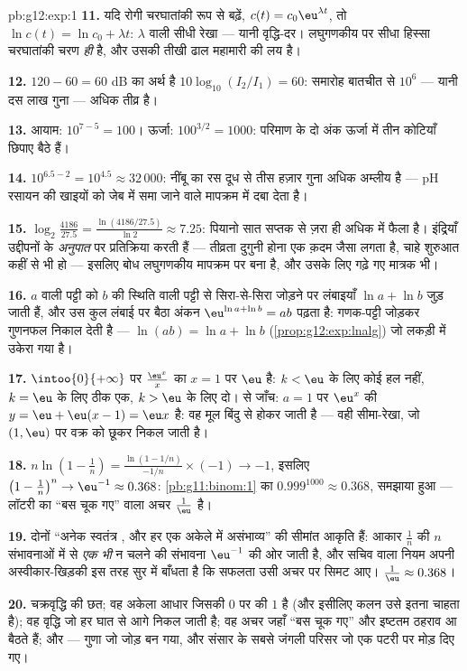 \begin{solution}{pb:g12:exp:1}
\textbf{11.} यदि रोगी चरघातांकी रूप से बढ़ें, $c(t) = c_0
\eu^{\lambda t}$, तो $\ln c(t) = \ln c_0 + \lambda t$:  $\lambda$
वाली सीधी रेखा --- यानी वृद्धि-दर। लघुगणकीय  पर सीधा हिस्सा चरघातांकी
चरण \emph{ही} है, और उसकी तीखी ढाल महामारी की लय है।

\textbf{12.} $120 - 60 = 60$ dB का अर्थ है $10\log_{10}(I_2/I_1) = 60$: समारोह बातचीत से $10^6$ --- यानी दस
लाख गुना --- अधिक तीव्र है।

\textbf{13.} आयाम: $10^{7-5} = 100$। ऊर्जा: $100^{3/2} = 1000$: परिमाण के दो अंक ऊर्जा में तीन कोटियाँ
छिपाए बैठे हैं।

\textbf{14.} $10^{6.5 - 2} = 10^{4.5} \approx 32\,000$: नींबू का रस दूध से तीस हज़ार गुना अधिक अम्लीय है --- pH
रसायन की खाइयों को जेब में समा जाने वाले मापक्रम में दबा देता है।

\textbf{15.} $\log_2\!\frac{4186}{27.5} =
\frac{\ln(4186/27.5)}{\ln 2} \approx 7.25$: पियानो सात सप्तक से ज़रा ही अधिक में फैला है। इंद्रियाँ
उद्दीपनों के \emph{अनुपात} पर प्रतिक्रिया करती हैं --- तीव्रता दुगुनी होना एक
क़दम जैसा लगता है, चाहे शुरुआत कहीं से भी हो --- इसलिए बोध लघुगणकीय मापक्रम
पर बना है, और उसके लिए गढ़े गए मात्रक भी।

\textbf{16.} $a$ वाली पट्टी को $b$ की स्थिति वाली पट्टी से सिरा-से-सिरा
जोड़ने पर लंबाइयाँ $\ln a + \ln b$ जुड़ जाती हैं, और उस कुल लंबाई पर बैठा अंकन $\eu^{\ln a + \ln b} = ab$
पढ़ता है: गणक-पट्टी  जोड़कर गुणनफल निकाल देती है --- $\ln(ab) = \ln a + \ln b$ (\cref{prop:g12:exp:lnalg}) जो
लकड़ी में उकेरा गया है।

\textbf{17.} $\intoo{0}{+\infty}$ पर $\frac{\eu^x}{x}$ का  $x = 1$ पर $\eu$ है: $k < \eu$ के लिए कोई
हल नहीं, $k = \eu$ के लिए ठीक एक, $k > \eu$ के लिए दो।  से जाँच: $a = 1$ पर
$\eu^x$ की  $y = \eu + \eu(x - 1) = \eu x$ है: वह मूल बिंदु से होकर जाती है --- वही सीमा-रेखा,
जो $(1, \eu)$ पर वक्र को छूकर निकल जाती है।

\textbf{18.} $n \ln\!\left(1 - \frac1n\right) =
\frac{\ln(1 - 1/n)}{-1/n} \times (-1) \to -1$, इसलिए $\left(1 - \frac1n\right)^n \to \eu^{-1} \approx 0.368$: \cref{pb:g11:binom:1} का $0.999^{1000} \approx 0.368$, समझाया हुआ --- लॉटरी का
``बस चूक गए'' वाला अचर $\frac1\eu$ है।

\textbf{19.} दोनों ``अनेक स्वतंत्र , और हर एक अकेले में असंभाव्य'' की
सीमांत आकृति हैं: आकार $\frac1n$ की $n$ संभावनाओं में से \emph{एक भी} न चलने
की संभावना $\eu^{-1}$ की ओर जाती है, और सचिव वाला नियम अपनी अस्वीकार-खिड़की इस तरह
सुर में बाँधता है कि सफलता उसी अचर पर सिमट आए। $\frac1\eu \approx 0.368$।

\textbf{20.} चक्रवृद्धि की छत; वह अकेला आधार जिसकी $0$ पर  की
 $1$ है (और इसीलिए कलन उसे इतना चाहता है); वह वृद्धि जो हर घात से
आगे निकल जाती है; वह अचर जहाँ ``बस चूक गए'' और इष्टतम ठहराव आ बैठते हैं; और
 --- गुणा जो जोड़ बन गया, और संसार के सबसे जंगली परिसर जो एक पटरी पर
मोड़ दिए गए।
\end{solution}
